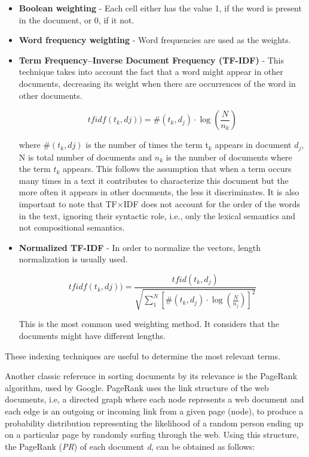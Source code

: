 \begin{itemize}
	\item \textbf{Boolean weighting} - Each cell either has the value 1, if the word is present in the document, or 0, if it not. 
    \item \textbf{Word frequency weighting} - Word frequencies are used as the weights.
    \item \textbf{Term Frequency–Inverse Document Frequency (TF-IDF)} - This technique takes into account the fact that a word might appear in other documents, decreasing its weight when there are occurrences of the word in other documents.
    \begin{figure}[H]
      \centering
    	\[ tfidf(t_k,dj)) = \#(t_k,d_j) \cdot \log (\frac{N}{n_k}) \]
      \end{figure}
      where \#$(t_k,dj)$ is the number of times the term t$_k$ appears in document $d_j$, N is total number of documents and $n_k$ is the number of documents where the term $t_k$ appears. This follows the assumption that when a term occurs many times in a text it contributes to characterize this document but the more often it appears in other documents, the less it discriminates. It is also important to note that TF$\times$IDF does not account for the order of the words in the text, ignoring their syntactic role, i.e., only the lexical semantics and not compositional semantics. 
      \item \textbf{Normalized TF-IDF} - In order to normalize the vectors, length normalization is usually used. 
      \begin{figure}[H]
      \centering
    	\[ tfidf(t_k,dj)) = \frac{tfid(t_k,d_j)}{\sqrt{\sum_{1}^{N}[\#(t_k,d_j)\cdot \log (\frac{N}{n_j})]^2}} \]
      \end{figure}
      This is the most common used weighting method. It considers that the documents might have different lengths.
\end{itemize}

These indexing techniques are useful to determine the most relevant terms.

Another classic reference in sorting documents by its relevance is the PageRank algorithm, used by Google. PageRank uses the link structure of the web documents, i.e, a directed graph where each node represents a web document and each edge is an outgoing or incoming link from a given page (node), to produce a probability distribution representing the likelihood of a random person ending up on a particular page by randomly surfing through the web. Using this structure, the PageRank (\textit{PR}) of each document \textit{d}, can be obtained as follows\citep{PageBrinPageRank1999,BrinPageGoogleAnatomy2012}: 

